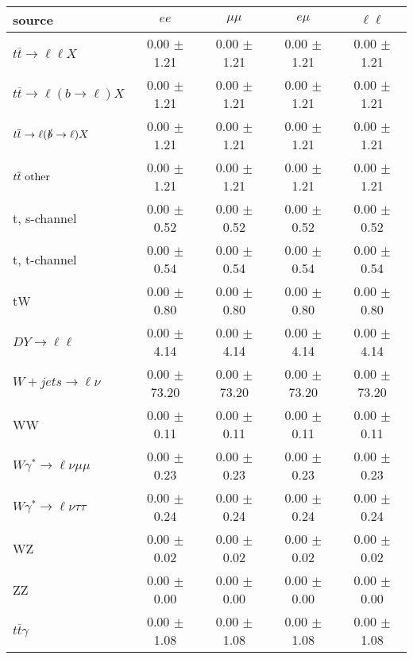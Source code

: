 \begin{tabular}{l|cccc} \hline\hline
source & $ee$ & $\mu\mu$ & $e\mu$ & $\ell\ell $ \\
\hline
$t\overline{t} \rightarrow \ell \ell X$ &  0.00 $\pm$  1.21 &  0.00 $\pm$  1.21 &  0.00 $\pm$  1.21 &  0.00 $\pm$  1.21 \\
$t\overline{t} \rightarrow \ell (b \rightarrow \ell) X$ &  0.00 $\pm$  1.21 &  0.00 $\pm$  1.21 &  0.00 $\pm$  1.21 &  0.00 $\pm$  1.21 \\
$t\overline{t} \rightarrow \ell (\slashed b \rightarrow \ell) X$ &  0.00 $\pm$  1.21 &  0.00 $\pm$  1.21 &  0.00 $\pm$  1.21 &  0.00 $\pm$  1.21 \\
        $t\overline{t}\ \rm{other}$ &  0.00 $\pm$  1.21 &  0.00 $\pm$  1.21 &  0.00 $\pm$  1.21 &  0.00 $\pm$  1.21 \\
\hline
                       t, s-channel &  0.00 $\pm$  0.52 &  0.00 $\pm$  0.52 &  0.00 $\pm$  0.52 &  0.00 $\pm$  0.52 \\
                       t, t-channel &  0.00 $\pm$  0.54 &  0.00 $\pm$  0.54 &  0.00 $\pm$  0.54 &  0.00 $\pm$  0.54 \\
                                 tW &  0.00 $\pm$  0.80 &  0.00 $\pm$  0.80 &  0.00 $\pm$  0.80 &  0.00 $\pm$  0.80 \\
\hline
         $DY \rightarrow \ell \ell$ &  0.00 $\pm$  4.14 &  0.00 $\pm$  4.14 &  0.00 $\pm$  4.14 &  0.00 $\pm$  4.14 \\
      $W+jets \rightarrow \ell \nu$ &  0.00 $\pm$ 73.20 &  0.00 $\pm$ 73.20 &  0.00 $\pm$ 73.20 &  0.00 $\pm$ 73.20 \\
                                 WW &  0.00 $\pm$  0.11 &  0.00 $\pm$  0.11 &  0.00 $\pm$  0.11 &  0.00 $\pm$  0.11 \\
\hline
$W\gamma^{*} \rightarrow \ell \nu \mu\mu$ &  0.00 $\pm$  0.23 &  0.00 $\pm$  0.23 &  0.00 $\pm$  0.23 &  0.00 $\pm$  0.23 \\
$W\gamma^{*} \rightarrow \ell \nu \tau\tau$ &  0.00 $\pm$  0.24 &  0.00 $\pm$  0.24 &  0.00 $\pm$  0.24 &  0.00 $\pm$  0.24 \\
                                 WZ &  0.00 $\pm$  0.02 &  0.00 $\pm$  0.02 &  0.00 $\pm$  0.02 &  0.00 $\pm$  0.02 \\
                                 ZZ &  0.00 $\pm$  0.00 &  0.00 $\pm$  0.00 &  0.00 $\pm$  0.00 &  0.00 $\pm$  0.00 \\
\hline
              $t\overline{t}\gamma$ &  0.00 $\pm$  1.08 &  0.00 $\pm$  1.08 &  0.00 $\pm$  1.08 &  0.00 $\pm$  1.08 \\

\end{tabular}

